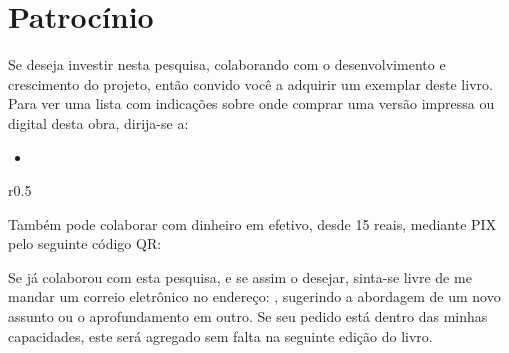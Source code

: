 \cleardoublepage
\pagestyle{empty}



\chapter*{Patrocínio}

\vfill


\begin{tcolorbox}[colback = colorPatrocinio, colframe = colorPatrocinio!80!black]%
    Se deseja investir nesta pesquisa, colaborando com o desenvolvimento e crescimento do projeto,
    então convido você a adquirir um exemplar deste livro. 
    Para ver uma lista com indicações sobre onde comprar uma versão impressa ou digital desta obra, dirija-se a: 
    \begin{itemize}
    \item \BookLinkBuy 
    \end{itemize}

    \begin{wrapfigure}{r}{0.5\textwidth}
    \vspace{-10pt}
    \centering\BookLinkQrPaymentMethod
    \end{wrapfigure}
    Também pode colaborar com dinheiro em efetivo, desde 15 reais,  
    mediante PIX pelo seguinte código QR:
    
    
    Se já colaborou com esta pesquisa, e se assim o desejar, 
    sinta-se livre de me mandar um correio eletrônico no endereço: 
    \BookLinkEmail, 
    sugerindo a abordagem de um novo assunto ou o aprofundamento em outro.
    Se seu pedido está dentro das minhas capacidades, 
    este será agregado sem falta na seguinte edição do livro.

    \begin{flushright}
    \BookAuthor ~
    \end{flushright}
\end{tcolorbox}%

\vfill

